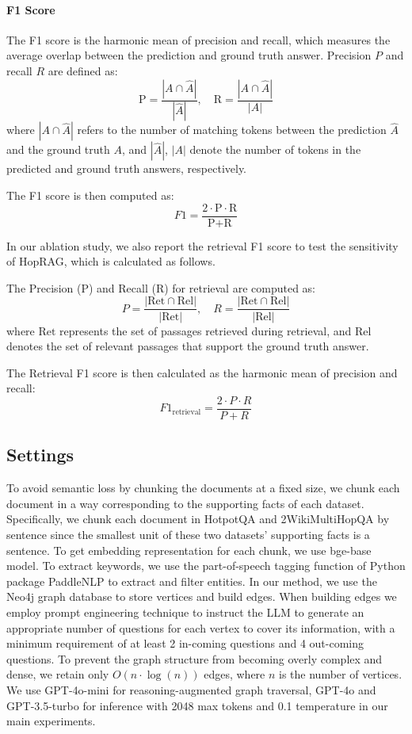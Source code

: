      \paragraph{F1 Score}
    The F1 score is the harmonic mean of precision and recall, which measures the average overlap between the prediction and ground truth answer. Precision \( P \) and recall \( R \) are defined as:
    \[
    \text{P} = \frac{| A \cap \hat{A} |}{| \hat{A} |}, \quad \text{R} = \frac{| A \cap \hat{A} |}{| A |}
    \]
    where \( | A \cap \hat{A} | \) refers to the number of matching tokens between the prediction \( \hat{A} \) and the ground truth \( A \), and \( |\hat{A}| \), \( |A| \) denote the number of tokens in the predicted and ground truth answers, respectively.

    The F1 score is then computed as:
    \[
    F1 = \frac{2 \cdot \text{P} \cdot \text{R}}{\text{P} + \text{R}}
    \]

In our ablation study, we also report the retrieval F1 score to test the sensitivity of HopRAG, which is calculated as follows.

The Precision (P) and Recall (R) for retrieval are computed as:
\[
P = \frac{| \text{Ret} \cap \text{Rel} |}{| \text{Ret} |}, \quad R = \frac{| \text{Ret} \cap \text{Rel} |}{| \text{Rel} |}
\]
where \( \text{Ret} \) represents the set of passages retrieved during retrieval, and \( \text{Rel} \) denotes the set of relevant passages that support the ground truth answer.

The Retrieval F1 score is then calculated as the harmonic mean of precision and recall:
\[
F1_{\text{retrieval}} = \frac{2 \cdot P \cdot R}{P + R}
\]
\subsection{Settings}  
\label{setup}
To avoid semantic loss by chunking the documents at a fixed size, we chunk each document in a way corresponding to the supporting facts of each dataset. Specifically, we chunk each document in HotpotQA and 2WikiMultiHopQA by sentence since the smallest unit of these two datasets' supporting facts is a sentence.
To get embedding representation for each chunk, we use bge-base model. To extract keywords, we use the part-of-speech tagging function of Python package PaddleNLP to extract and filter entities.
In our method, we use the Neo4j graph database to store vertices and build edges. When building edges we employ prompt engineering technique to instruct the LLM to generate an appropriate number of questions for each vertex to cover its information, with a minimum requirement of at least 2 in-coming questions and 4 out-coming questions. To prevent the graph structure from becoming overly complex and dense, we retain only $O(n\cdot\log(n))$ edges, where $n$ is the number of vertices. We use GPT-4o-mini for reasoning-augmented graph traversal, GPT-4o and GPT-3.5-turbo for inference with 2048 max tokens and 0.1 temperature in our main experiments. 

